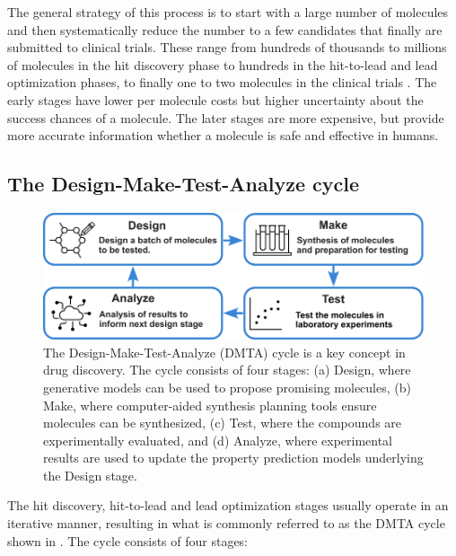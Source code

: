 The general strategy of this process is to start with a large number of molecules and then
systematically reduce the number to a few candidates that finally are submitted to clinical trials.
These range from hundreds of thousands to millions of molecules in the hit discovery phase to hundreds
in the hit-to-lead and lead optimization phases, to finally one to two molecules in the clinical trials \citep{hughesPrinciplesEarlyDrug2011}.
The early stages have lower per molecule costs but higher uncertainty about the success
chances of a molecule. The later stages are more expensive, but provide more accurate information
whether a molecule is safe and effective in humans.

\subsection{The Design-Make-Test-Analyze cycle}
\begin{figure}
      \centering
      \includegraphics[width=\textwidth]{figures/dmta_cycle_v2.pdf}
      \caption{The Design-Make-Test-Analyze (DMTA) cycle is a key concept in drug discovery. The
            cycle consists of four stages: (a) Design, where generative models can be used to
            propose promising molecules, (b) Make, where computer-aided synthesis planning tools
            ensure molecules can be synthesized, (c) Test, where the compounds are experimentally
            evaluated, and (d) Analyze, where experimental results are used to update the property
            prediction models underlying the Design stage. \label{fig:dmta-cycle}}
\end{figure}
The hit discovery, hit-to-lead and lead optimization stages usually operate in an iterative manner,
resulting in what is commonly referred to as the \ac{DMTA} cycle \citep{wesolowskiStrategiesPoliticsSuccessful2016}
shown in . The cycle consists of four stages:
